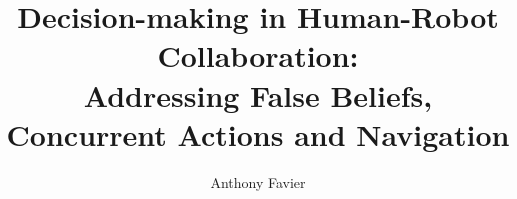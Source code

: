 %
%
%
% 
%



\title{\textbf{\large Decision-making in Human-Robot Collaboration:\\Addressing False Beliefs, Concurrent Actions and Navigation}}
\author{Anthony Favier}

